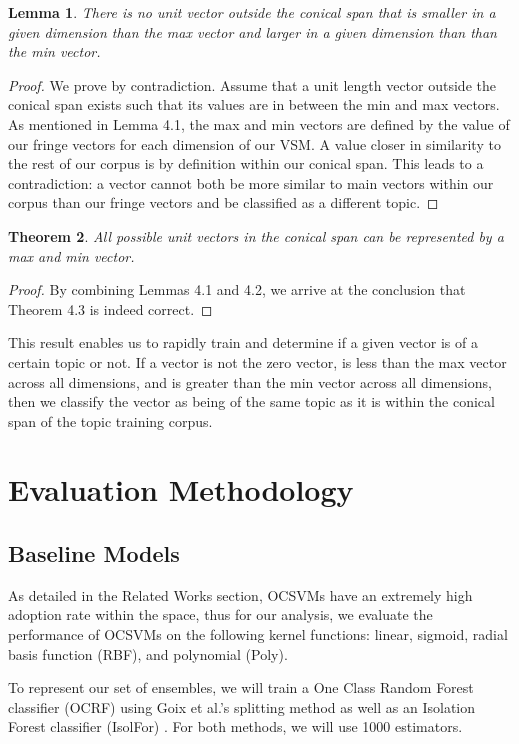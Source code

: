 \documentclass[11pt]{article}
\newtheorem{theorem}{Theorem}[section]
\newtheorem{lemma}[theorem]{Lemma}
\begin{document}
\begin{lemma}
There is no unit vector outside the conical span that is smaller in a given dimension than the max vector and larger in a given dimension than than the min vector.
\end{lemma}
\begin{proof}
We prove by contradiction. Assume that a unit length vector outside the conical span exists such that its values are in between the min and max vectors. As mentioned in Lemma 4.1, the max and min vectors are defined by the value of our fringe vectors for each dimension of our VSM. A value closer in similarity to the rest of our corpus is by definition within our conical span. This leads to a contradiction: a vector cannot both be more similar to main vectors within our corpus than our fringe vectors and be classified as a different topic. 
\end{proof}

\begin{theorem}
All possible unit vectors in the conical span can be represented by a max and min vector.
\end{theorem}
\begin{proof}
By combining Lemmas 4.1 and 4.2, we arrive at the conclusion that Theorem 4.3 is indeed correct.
\end{proof}

This result enables us to rapidly train and determine if a given vector is of a certain topic or not. If a vector is not the zero vector, is less than the max vector across all dimensions, and is greater than the min vector across all dimensions, then we classify the vector as being of the same topic as it is within the conical span of the topic training corpus.

\section{Evaluation Methodology}

\subsection{Baseline Models}
As detailed in the Related Works section, OCSVMs have an extremely high adoption rate within the space, thus for our analysis, we evaluate the performance of OCSVMs on the following kernel functions: linear, sigmoid, radial basis function (RBF), and polynomial (Poly).

To represent our set of ensembles, we will train a One Class Random Forest classifier (OCRF) using Goix et al.'s splitting method \cite{goix2017one} as well as an Isolation Forest classifier (IsolFor) \cite{liu2008isolation}. For both methods, we will use 1000 estimators.
\end{document}

